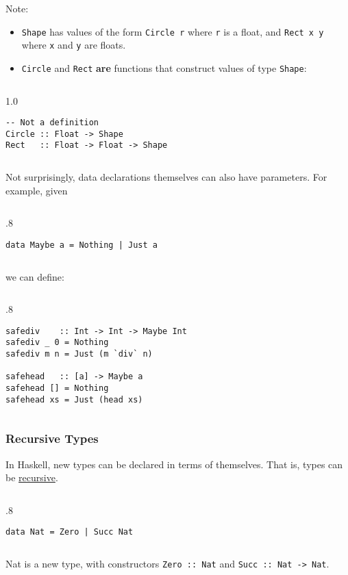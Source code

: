 \documentclass{beamer}
\newenvironment{codeblock}[1][.8]{%
\begin{columns}
\begin{column}{#1\linewidth}
\begin{exampleblock}{}}{%
\end{exampleblock}
\end{column}
\end{columns}}
\newenvironment{execblock}[1][.8]{%
\begin{columns}
\begin{column}{#1\linewidth}
\begin{block}{}}{%
\end{block}
\end{column}
\end{columns}}
\def\slideskip{\vskip 0.1in}
\begin{document}
\begin{frame}[fragile]
\LARGE

Note: 
\begin{itemize}
\item {\tt Shape} has values of the form {\tt Circle r} where {\tt r} is 
a float, and {\tt Rect x y} where {\tt x} and {\tt y} are floats. 
\item {\tt Circle} and {\tt Rect} {\bf are} functions that 
construct values of type {\tt Shape}: 
\end{itemize}


\begin{execblock}[1.0]
\begin{verbatim}
-- Not a definition
Circle :: Float -> Shape 
Rect   :: Float -> Float -> Shape
\end{verbatim}
\end{execblock}


\end{frame}



\begin{frame}[fragile]
\large

Not surprisingly, data declarations themselves can 
also have parameters.  For example, given 
\slideskip

\begin{codeblock}
\begin{verbatim}
data Maybe a = Nothing | Just a 
\end{verbatim}
\end{codeblock}

\slideskip
we can define:
\slideskip

\begin{codeblock}
\begin{verbatim}
safediv    :: Int -> Int -> Maybe Int 
safediv _ 0 = Nothing 
safediv m n = Just (m `div` n) 

safehead   :: [a] -> Maybe a 
safehead [] = Nothing 
safehead xs = Just (head xs) 
\end{verbatim}
\end{codeblock}

\end{frame}

\begin{frame}[fragile]
\Large

\frametitle{Recursive Types}

In Haskell, new types can be declared in terms of 
themselves.  That is, types can be \underline{recursive}. 

\slideskip

\begin{codeblock}
\begin{verbatim}
data Nat = Zero | Succ Nat
\end{verbatim}
\end{codeblock}

\slideskip
Nat is a new type, with constructors 
{\tt Zero :: Nat} and {\tt Succ :: Nat -> Nat}.

\end{frame}
\end{document}
